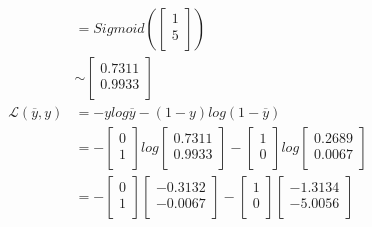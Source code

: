 \documentclass[addpoints]{exam}
\begin{document}
\begin{align*}
        &= Sigmoid(\begin{bmatrix}
            1\\
            5\\
        \end{bmatrix})\\
        &\sim \begin{bmatrix}
            0.7311\\
            0.9933\\
        \end{bmatrix}\\
        \mathcal{L}(\overline{y}, y) &= -ylog\overline{y}-(1-y)log(1-\overline{y})\\
        &= -\begin{bmatrix}
        0\\
        1\\
        \end{bmatrix}log\begin{bmatrix}
            0.7311\\
            0.9933\\
        \end{bmatrix}-\begin{bmatrix}
        1\\
        0\\
        \end{bmatrix}log\begin{bmatrix}
            0.2689\\
            0.0067\\
        \end{bmatrix}\\
        &= -\begin{bmatrix}
        0\\
        1\\
        \end{bmatrix}\begin{bmatrix}
            -0.3132\\
            -0.0067\\
        \end{bmatrix}-\begin{bmatrix}
        1\\
        0\\
        \end{bmatrix}\begin{bmatrix}
            -1.3134\\
            -5.0056\\
        \end{bmatrix}\\

\end{align*}
\end{document}
